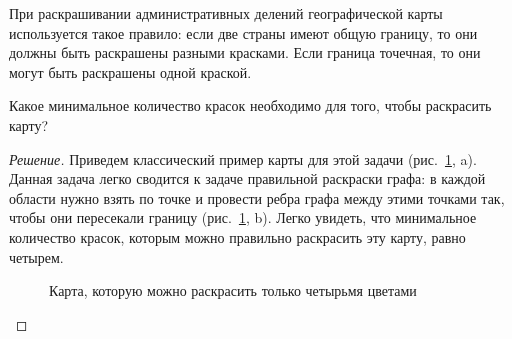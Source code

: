 \documentclass[russian]{lecture-notes}
\begin{document}
    \begin{example*}
        При раскрашивании административных делений географической карты используется такое правило: если две страны имеют общую границу, то они должны быть раскрашены разными красками. Если граница точечная, то они могут быть раскрашены одной краской.

        Какое минимальное количество красок необходимо для того, чтобы  раскрасить карту?

        \begin{proof}[Решение] Приведем классический пример карты для этой задачи (рис.~\ref{fig:map}, a). Данная задача легко сводится к задаче правильной раскраски графа: в каждой области нужно взять по точке и провести ребра графа между этими точками так, чтобы они пересекали границу (рис.~\ref{fig:map}, b). Легко увидеть, что минимальное количество красок, которым можно правильно раскрасить эту карту, равно четырем.

        \begin{figure}
            \centering
            \caption{Карта, которую можно раскрасить только четырьмя цветами}\label{fig:map}
        \end{figure}
        \end{proof}
    \end{example*}
\end{document}
